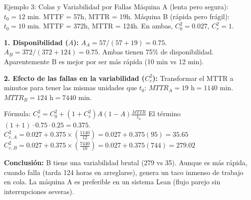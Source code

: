 \begin{ejercicio}{Ejemplo 3: Colas y Variabilidad por Fallas}
Máquina A (lenta pero segura): $t_0 = 12$ min. MTTF = 57h, MTTR = 19h.
Máquina B (rápida pero frágil): $t_0 = 10$ min. MTTF = 372h, MTTR = 124h.
En ambas, $C_0^2 = 0.027$, $C_r^2 = 1$.

\textbf{1. Disponibilidad ($A$):}
$A_A = 57 / (57 + 19) = 0.75$.
$A_B = 372 / (372 + 124) = 0.75$.
Ambas tienen 75\% de disponibilidad. Aparentemente B es mejor por ser más rápida (10 min vs 12 min).

\textbf{2. Efecto de las fallas en la variabilidad ($C_e^2$):}
Transformar el MTTR a minutos para tener las mismas unidades que $t_0$:
$MTTR_A = 19 \text{ h} = 1140$ min.
$MTTR_B = 124 \text{ h} = 7440$ min.

Fórmula: $C_e^2 = C_0^2 + (1+C_r^2)A(1-A)\frac{MTTR}{t_0}$
El término $(1+1) \cdot 0.75 \cdot 0.25 = 0.375$.
$C_{e,A}^2 = 0.027 + 0.375 \times \left( \frac{1140}{12} \right) = 0.027 + 0.375(95) = 35.65$
$C_{e,B}^2 = 0.027 + 0.375 \times \left( \frac{7440}{10} \right) = 0.027 + 0.375(744) = 279.02$

\textbf{Conclusión:} B tiene una variabilidad brutal (279 vs 35). Aunque es más rápida, cuando falla (tarda 124 horas en arreglarse), genera un taco inmenso de trabajo en cola. La máquina A es preferible en un sistema Lean (flujo parejo sin interrupciones severas).
\end{ejercicio}
